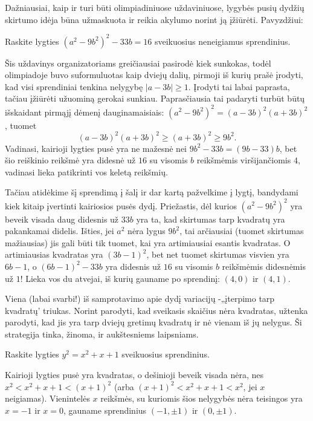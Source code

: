Dažniausiai, kaip ir turi būti olimpiadiniuose uždaviniuose, lygybės pusių
dydžių skirtumo idėja būna užmaskuota ir reikia akylumo norint ją įžiūrėti.
Pavyzdžiui:

\begin{pav} \text{\emph{[LitKo 2009]}} Raskite lygties
  $(a^2 - 9b^2)^2 - 33b = 16$ sveikuosius neneigiamus sprendinius.
\end{pav}

\begin{sprendimas}
Šis uždavinys organizatoriams greičiausiai pasirodė kiek sunkokas, todėl
olimpiadoje buvo suformuluotas kaip dviejų dalių, pirmoji iš kurių prašė
įrodyti, kad visi sprendiniai tenkina nelygybę $|a-3b|\geq 1$. Įrodyti tai
labai paprasta, tačiau įžiūrėti užuominą gerokai sunkiau. Paprasčiausia tai
padaryti turbūt būtų išskaidant pirmąjį dėmenį dauginamaisiais: $(a^2 -
9b^2)^2 = (a-3b)^2(a+3b)^2$, tuomet
$$(a-3b)^2(a+3b)^2 \geq (a+3b)^2\geq 9b^2.$$
Vadinasi, kairioji lygties pusė yra ne mažesnė nei $9b^2 - 33b=(9b-33)b$, bet
šio reiškinio reikšmė yra didesnė už $16$ su visomis $b$ reikšmėmis
viršijančiomis $4$, vadinasi lieka patikrinti vos keletą reikšmių.

Tačiau atidėkime šį sprendimą į šalį ir dar kartą pažvelkime į lygtį,
bandydami kiek kitaip įvertinti kairiosios pusės dydį. Priežastis, dėl
kurios $(a^2-9b^2)^2$ yra beveik visada daug didesnis už $33b$ yra
ta, kad skirtumas tarp kvadratų yra pakankamai didelis. Išties, jei
$a^2$ nėra lygus $9b^2$, tai arčiausiai (tuomet skirtumas mažiausias) jis
gali būti tik tuomet, kai yra artimiausiai esantis kvadratas. O
artimiausias kvadratas yra $(3b-1)^2$, bet net tuomet skirtumas visvien yra
$6b-1$, o $(6b-1)^2 - 33b$ yra didesnis už $16$ su visomis $b$ reikšmėmis
didesnėmis už $1$! Lieka vos du atvejai, iš kurių gauname po sprendinį:
$(4,0)$ ir $(4,1)$.
\end{sprendimas}

Viena (labai svarbi!) iš samprotavimo apie dydį variacijų -„įterpimo tarp
kvadratų' triukas. Norint parodyti, kad sveikasis skaičius nėra kvadratas,
užtenka parodyti, kad jis yra tarp dviejų gretimų kvadratų ir nė vienam iš
jų nelygus. Ši strategija tinka, žinoma, ir aukštesniems laipsniams.

\begin{pav} Raskite lygties $y^2 = x^2 + x + 1$ sveikuosius sprendinius.
\end{pav}

\begin{sprendimas}
Kairioji lygties pusė yra kvadratas, o dešinioji beveik visada nėra, nes
$x^2 < x^2 + x + 1 < (x+1)^2$ (arba $(x+1)^2 < x^2 + x + 1 < x^2$, jei $x$
neigiamas).  Vienintelės $x$ reikšmės, su kuriomis šios nelygybės nėra
teisingos yra $x=-1$ ir $x=0$, gauname sprendinius $(-1, \pm 1)$ ir $(0,
\pm 1)$.
\end{sprendimas}

